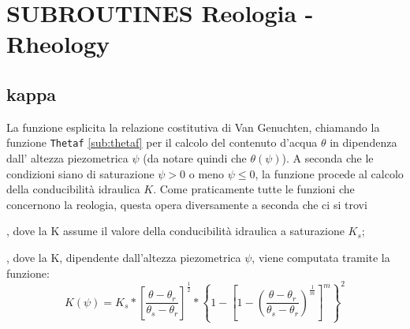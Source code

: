 \documentclass[
10pt, %
a4paper, %
oneside, %
headinclude,footinclude, %
BCOR5mm, %
]{scrartcl}
\begin{document}
\begin{itemize}
\begin{figure}[!h]
{		}
		\hspace{1cm}
		\hspace{1cm}
		\end{figure}						
\end{itemize}

\section{SUBROUTINES Reologia - Rheology}


	\subsection{kappa}
		La funzione esplicita la relazione costitutiva di Van Genuchten, chiamando la funzione
		\texttt{Thetaf} \ref{sub:thetaf} per il calcolo del contenuto d'acqua $\theta$ in dipendenza dall'
		altezza piezometrica $\psi$ (da notare quindi che $\theta(\psi)$).
		A seconda che le condizioni siano di saturazione $\psi>0$ o meno $\psi\leq0$, la funzione procede
		al calcolo della conducibilità idraulica $K$.
		Come praticamente tutte le funzioni che concernono la reologia, questa opera diversamente a seconda
		che ci si trovi
		\begin{description}\itemsep0pt
			\item[in saturazione], dove la K assume il valore della conducibilità idraulica a saturazione $K_{s}$;
			\item[in zona insatura], dove la K, dipendente dall'altezza piezometrica $\psi$, viene computata 
			tramite la funzione:
			\begin{equation}
				K(\psi) = K_{s}*\left[\frac{\theta-\theta_{r}}{\theta_{s}-\theta_{r}}\right]^{\frac{1}{2}}*\left\{1-\left[1-\left(\frac{\theta-\theta_{r}}{\theta_{s}-\theta_{r}}\right)^{\frac{1}{m}}\right]^{m}\right\}^{2}
			\label{eq:kappainsat}
			\end{equation}
		\end{description}
\end{document}
